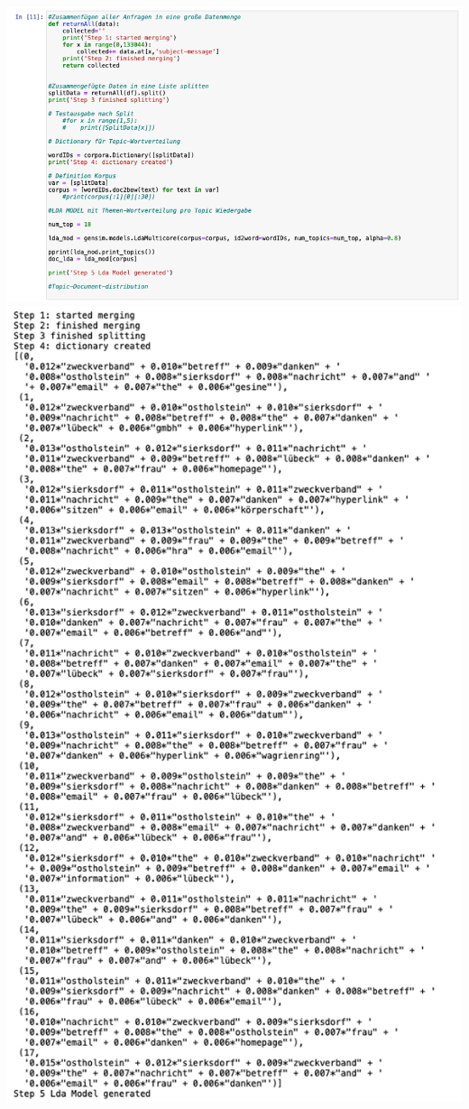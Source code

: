 \documentclass[german,version-2020-11]{uzl-thesis}
\begin{document}
\includegraphics[scale=0.5]{lda1.png}
\includegraphics[scale=0.5]{lda2.png}
\end{document}
